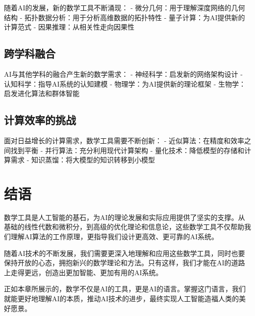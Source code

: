 随着AI的发展，新的数学工具不断涌现：
- 微分几何：用于理解深度网络的几何结构
- 拓扑数据分析：用于分析高维数据的拓扑特性
- 量子计算：为AI提供新的计算范式
- 因果推理：从相关性走向因果性

\subsection{跨学科融合}

AI与其他学科的融合产生新的数学需求：
- 神经科学：启发新的网络架构设计
- 认知科学：指导AI系统的认知建模
- 物理学：为AI提供新的理论框架
- 生物学：启发进化算法和群体智能

\subsection{计算效率的挑战}

面对日益增长的计算需求，数学工具需要不断创新：
- 近似算法：在精度和效率之间找到平衡
- 并行算法：充分利用现代计算架构
- 量化技术：降低模型的存储和计算需求
- 知识蒸馏：将大模型的知识转移到小模型

\section{结语}

数学工具是人工智能的基石，为AI的理论发展和实际应用提供了坚实的支撑。从基础的线性代数和微积分，到高级的优化理论和信息论，这些数学工具不仅帮助我们理解AI算法的工作原理，更指导我们设计更高效、更可靠的AI系统。

随着AI技术的不断发展，我们需要更深入地理解和应用这些数学工具，同时也要保持开放的心态，拥抱新兴的数学理论和方法。只有这样，我们才能在AI的道路上走得更远，创造出更加智能、更加有用的AI系统。

正如本章所展示的，数学不仅是AI的工具，更是AI的语言。掌握这门语言，我们就能更好地理解AI的本质，推动AI技术的进步，最终实现人工智能造福人类的美好愿景。

\nocite{*}
